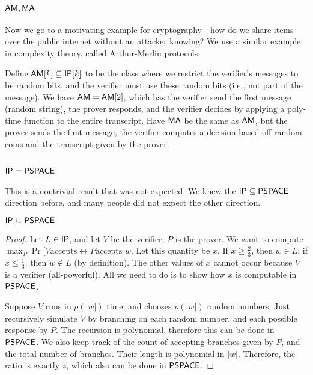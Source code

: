 \subsection{${\mathsf{AM}}, {\mathsf{MA}}$}
Now we go to a motivating example for cryptography - how do we share items over the public internet without an attacker knowing? We use a similar example in complexity theory, called Arthur-Merlin protocols:

\begin{definition}
Define ${\mathsf{AM}}[k] \subseteq {\ensuremath{\mathsf{IP}}}[k]$ to be the class where we restrict the verifier's messages to be random bits, and the verifier must use these random bits (i.e., not part of the message). We have ${\mathsf{AM}} = {\mathsf{AM}}[2]$, which has the verifier send the first message (random string), the prover responds, and the verifier decides by applying a poly-time function to the entire transcript. Have ${\mathsf{MA}}$ be the same as ${\mathsf{AM}}$, but the prover sends the first message, the verifier computes a decision based off random coins and the transcript given by the prover.

\subsection{${\mathsf{IP}} = {\mathsf{PSPACE}}$}
This is a nontrivial result that was not expected. We knew the ${\mathsf{IP}} \subseteq {\ensuremath{\mathsf{PSPACE}}}$ direction before, and many people did not expect the other direction. 
\begin{theorem}
${\mathsf{IP}} \subseteq {\ensuremath{\mathsf{PSPACE}}}$
\end{theorem}

\begin{proof}
Let $L \in {\ensuremath{\mathsf{IP}}}$, and let $V$ be the verifier, $P$ is the prover. We want to compute $\max_{P}\Pr[V \text{accepts} \leftrightarrow P \text{accepts $w$}$. Let this quantity be $x$. If $x \ge \frac{2}{3}$, then $w \in L$; if $x \le \frac{1}{3}$, then $w \notin L$ (by definition). The other values of $x$ cannot occur because $V$ is a verifier (all-powerful). All we need to do is to show how $x$ is computable in ${\mathsf{PSPACE}}$.

\par Suppose $V$ runs in $p(|w|)$ time, and chooses $p(|w|)$ random numbers. Just recursively simulate $V$ by branching on each random number, and each possible response by $P$. The recursion is polynomial, therefore this can be done in ${\mathsf{PSPACE}}$. We also keep track of the count of accepting branches given by $P$, and the total number of branches. Their length is polynomial in $|w|$. Therefore, the ratio is exactly $z$, which also can be done in ${\mathsf{PSPACE}}$.
\end{proof}

\end{definition}